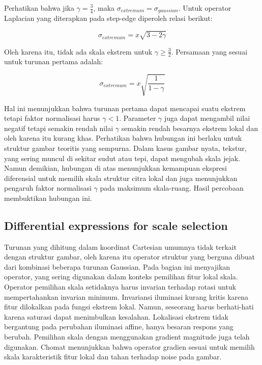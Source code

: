 Perhatikan bahwa jika \(\gamma = \frac{3}{4}\), maka \(\sigma_{extremum} = \sigma_{gaussian}\). Untuk operator Laplacian yang diterapkan pada step-edge diperoleh relasi berikut:

\begin{equation}
  \sigma_{extremum} = x\sqrt{3 - 2\gamma}
\end{equation}

Oleh karena itu, tidak ada skala ekstrem untuk \(\gamma \geq \frac{3}{2}\). Persamaan yang sesuai untuk turunan pertama adalah:

\begin{equation}
  \sigma_{extremum} = x\sqrt{\frac{1}{1-\gamma}}
\end{equation}

Hal ini menunjukkan bahwa turunan pertama dapat mencapai suatu ekstrem tetapi faktor normalisasi harus \(\gamma < 1\). Parameter \(\gamma\) juga dapat mengambil 
nilai negatif tetapi semakin rendah nilai \(\gamma\) semakin rendah besarnya ekstrem lokal dan oleh karena itu kurang khas. Perhatikan bahwa hubungan ini berlaku untuk struktur 
gambar teoritis yang sempurna. Dalam kasus gambar nyata, tekstur, yang sering muncul di sekitar sudut atau tepi, dapat mengubah skala jejak. Namun demikian, 
hubungan di atas menunjukkan kemampuan ekspresi diferensial untuk memilih skala struktur citra lokal dan juga menunjukkan pengaruh faktor normalisasi \(\gamma\) pada maksimum skala-ruang. 
Hasil percobaan membuktikan hubungan ini.

\subsection{Differential expressions for scale selection}
Turunan yang dihitung dalam koordinat Cartesian umumnya tidak terkait dengan struktur gambar, oleh karena itu operator struktur yang berguna dibuat dari kombinasi 
beberapa turunan Gaussian. Pada bagian ini menyajikan operator, yang sering digunakan dalam konteks pemilihan fitur lokal skala. Operator pemilihan skala setidaknya 
harus invarian terhadap rotasi untuk mempertahankan invarian minimum. Invariansi iluminasi kurang kritis karena fitur dilokalkan pada fungsi ekstrem lokal. 
Namun, seseorang harus berhati-hati karena saturasi dapat menimbulkan kesalahan. Lokalisasi ekstrem tidak bergantung pada perubahan iluminasi affine, hanya besaran respons yang berubah. 
Pemilihan skala dengan menggunakan gradient magnitude juga telah digunakan. Chomat menunjukkan bahwa operator gradien sesuai untuk memilih skala karakteristik fitur lokal dan tahan terhadap noise pada gambar.

